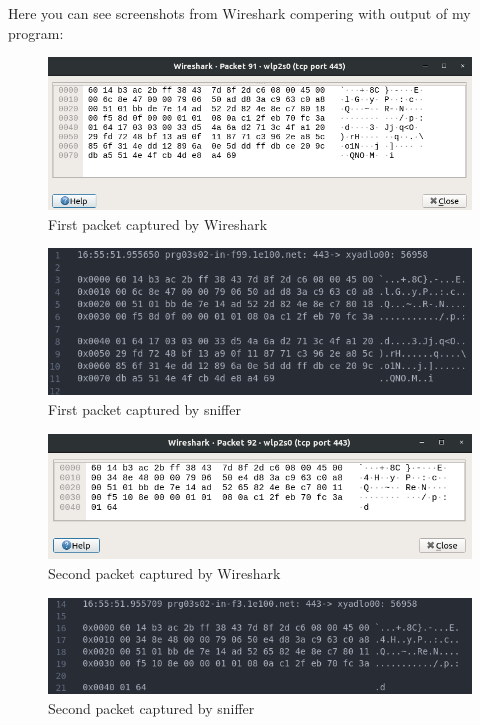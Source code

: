 \documentclass[12pt,a4paper]{article}
\begin{document}
Here you can see screenshots from Wireshark compering with output of my program:

\begin{figure}[h!]
    \centering
    \includegraphics[width=\textwidth,height=\textheight,keepaspectratio]{first_packet.png}
    \caption{First packet captured by Wireshark}
\end{figure}

\begin{figure}[h!]
    \centering
    \includegraphics[width=\textwidth,height=\textheight,keepaspectratio]{my_first_packet.png}
    \caption{First packet captured by sniffer}
\end{figure}

\begin{figure}[h!]
    \centering
    \includegraphics[width=\textwidth,height=\textheight,keepaspectratio]{second_packet.png}
    \caption{Second packet captured by Wireshark}
\end{figure}

\begin{figure}[h!]
    \centering
    \includegraphics[width=\textwidth,height=\textheight,keepaspectratio]{my_second_packet.png}
    \caption{Second packet captured by sniffer}
\end{figure}
\end{document}
